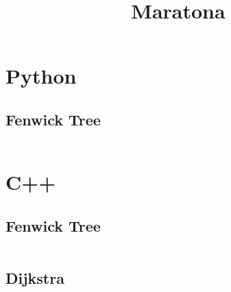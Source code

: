 \documentclass{article}
\title{Maratona}
\author{}
\date{}
\begin{document}
\maketitle
\tableofcontents
\newpage

\section{Python}
\subsection{Fenwick Tree}
\inputminted{python}{code/fenwick.py}

\section{C++}
\subsection{Fenwick Tree}
\inputminted[obeytabs=true,tabsize=4]{cpp}{code/fenwick.cpp}
\subsection{Dijkstra}
\inputminted[obeytabs=true,tabsize=4]{cpp}{code/dijkstra.cpp}
\end{document}
